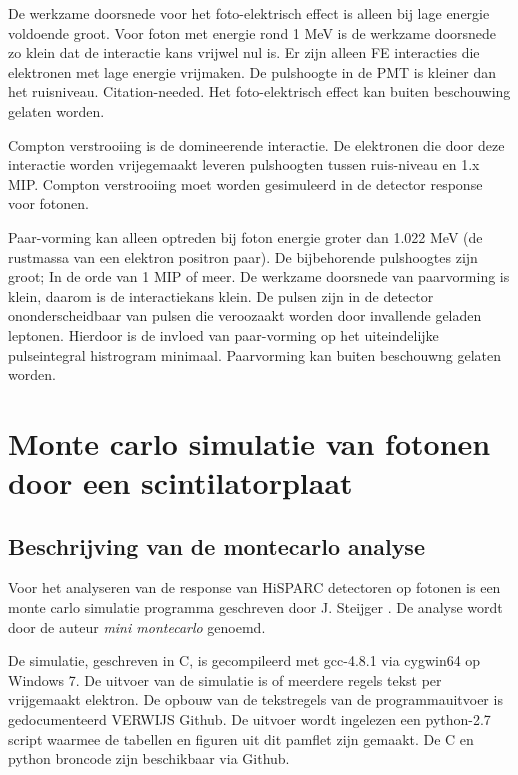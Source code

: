 \documentclass[a4paper,11pt]{article}
\begin{document}
De werkzame doorsnede voor het foto-elektrisch effect is alleen bij lage energie voldoende groot. Voor foton met energie rond 1 MeV is de werkzame doorsnede zo klein dat de interactie kans vrijwel nul is. Er zijn alleen FE interacties die elektronen met lage energie vrijmaken. De pulshoogte in de PMT is kleiner dan het ruisniveau. Citation-needed. Het foto-elektrisch effect kan buiten beschouwing gelaten worden.

Compton verstrooiing is de domineerende interactie. De elektronen die door deze interactie worden vrijegemaakt leveren pulshoogten tussen ruis-niveau en 1.x MIP. Compton verstrooiing moet worden gesimuleerd in de detector response voor fotonen.

Paar-vorming kan alleen optreden bij foton energie groter dan 1.022 MeV (de rustmassa van een elektron positron paar). De bijbehorende pulshoogtes zijn groot; In de orde van 1 MIP of meer. De werkzame doorsnede van paarvorming is klein, daarom is de interactiekans klein. De pulsen zijn in de detector ononderscheidbaar van pulsen die veroozaakt worden door invallende geladen leptonen. Hierdoor is de invloed van paar-vorming op het uiteindelijke pulseintegral histrogram minimaal. Paarvorming kan buiten beschouwng gelaten worden.


\section{Monte carlo simulatie van fotonen door een scintilatorplaat}

\subsection{Beschrijving van de montecarlo analyse}
Voor het analyseren van de response van HiSPARC detectoren op fotonen is een monte carlo simulatie programma geschreven door J. Steijger \citep*{Steijger2010-gammas}. De analyse wordt door de auteur \textit{mini montecarlo} genoemd.

De simulatie, geschreven in C, is gecompileerd met gcc-4.8.1 via cygwin64 op Windows 7. De uitvoer van de simulatie is of meerdere regels tekst per vrijgemaakt elektron. De opbouw van de tekstregels van de programmauitvoer is gedocumenteerd VERWIJS Github. De uitvoer wordt ingelezen een python-2.7 script waarmee de tabellen en figuren uit dit pamflet zijn gemaakt. De C en python broncode zijn beschikbaar via Github.
\end{document}
